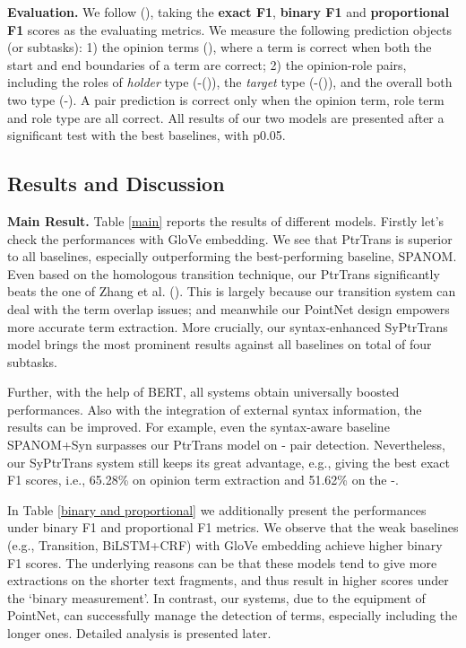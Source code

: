 \documentclass[letterpaper]{article} \usepackage{aaai22}  \usepackage{times}  \usepackage{helvet}  \usepackage{courier}  \usepackage[hyphens]{url}  \usepackage{graphicx} \urlstyle{rm} \def\UrlFont{\rm}  \usepackage{natbib}  \usepackage{caption} \DeclareCaptionStyle{ruled}{labelfont=normalfont,labelsep=colon,strut=off} \frenchspacing  \setlength{\pdfpagewidth}{8.5in}  \setlength{\pdfpageheight}{11in}  \usepackage{algorithm}
\begin{document}
\noindent\textbf{Evaluation.}
We follow \citeauthor{xia-etal-2021-unified}(\citeyear{xia-etal-2021-unified}), taking the \textbf{exact F1}, \textbf{binary F1} and \textbf{proportional F1} scores as the evaluating metrics.
We measure the following prediction objects (or subtasks):
1) the opinion terms (), where a term is correct when both the start and end boundaries of a term are correct;
2) the opinion-role pairs, including the roles of \emph{holder} type (-()), the \emph{target} type (-()), and the overall both two type (-).
A pair prediction is correct only when the opinion term, role term and
role type are all correct.
All results of our two models are presented after a significant test with the best baselines, with p0.05.










\subsection{Results and Discussion}



\noindent\textbf{Main Result.}
Table \ref{main} reports the results of different models.
Firstly let's check the performances with GloVe embedding.
We see that PtrTrans is superior to all baselines, especially outperforming the best-performing baseline, {S{\small PAN}OM}.
Even based on the homologous transition technique, our PtrTrans significantly beats the one of Zhang et al. (\citeyear{ZhangWF19}).
This is largely because our transition system can deal with the term overlap issues; and meanwhile our PointNet design empowers more accurate term extraction.
More crucially, our syntax-enhanced SyPtrTrans model brings the most prominent results against all baselines on total of four subtasks.


Further, with the help of BERT, all systems obtain universally boosted performances.
Also with the integration of external syntax information, the results can be improved.
For example, even the syntax-aware baseline S{\small PAN}OM+Syn surpasses our PtrTrans model on - pair detection.
Nevertheless, our SyPtrTrans system still keeps its great advantage, e.g., giving the best exact F1 scores, i.e., 65.28\% on opinion term extraction and 51.62\% on the -.


In Table \ref{binary and proportional} we additionally present the performances under binary F1 and proportional F1 metrics.
We observe that the weak baselines (e.g., Transition, BiLSTM+CRF) with GloVe embedding achieve higher binary F1 scores.
The underlying reasons can be that these models tend to give more extractions on the shorter text fragments, and thus result in higher scores under the `binary measurement'.
In contrast, our systems, due to the equipment of PointNet, can successfully manage the detection of terms, especially including the longer ones.
Detailed analysis is presented later.
\end{document}
